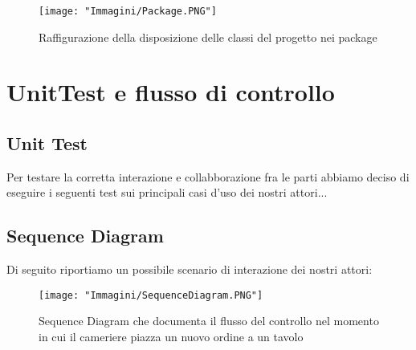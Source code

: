 \documentclass{article}
\begin{document}
\begin{figure}[!h]
\centering
\texttt{[image: "Immagini/Package.PNG"]}
\caption{Raffigurazione della disposizione delle classi del progetto nei package}
\end{figure}

\section{UnitTest e flusso di controllo}
\subsection{Unit Test}
Per testare la corretta interazione e collabborazione fra le parti abbiamo deciso di eseguire i seguenti test sui principali casi d'uso dei nostri attori...


\newpage

\subsection{Sequence Diagram}
Di seguito riportiamo un possibile scenario di interazione dei nostri attori:

\begin{figure}[!h]
\centering
\texttt{[image: "Immagini/SequenceDiagram.PNG"]}
\caption{Sequence Diagram che documenta il flusso del controllo nel momento in cui il cameriere piazza un nuovo ordine a un tavolo}
\label{SequenceDiagram}
\end{figure}
\end{document}
